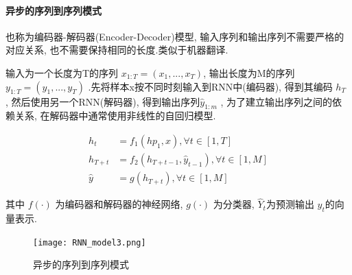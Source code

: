 \paragraph{异步的序列到序列模式}
也称为编码器-解码器(Encoder-Decoder)模型, 输入序列和输出序列不需要严格的对应关系, 也不需要保持相同的长度.类似于机器翻译.

输入为一个长度为T的序列 $ x_{1:T}=(x_1, ...,  x_T)$, 输出长度为M的序列 $ y_{1:T}=(y_1, ...,  y_T)$ .先将样本x按不同时刻输入到RNN中(编码器), 得到其编码 $h_T$ , 然后使用另一个RNN(解码器), 得到输出序列$ \hat{y}_{1:m}$ , 为了建立输出序列之间的依赖关系, 在解码器中通常使用非线性的自回归模型.

\begin{equation}
    \begin{split}
        h_t &= f_1(hp_1, x),   \forall t \in [1, T] \\
    h_{T+t}& = f_2(h_{T+t-1}, \hat{y}_{t-1}),  \forall t\in[1, M]\\
    \hat{y}&= g(h_{T+t}),   \forall t\in[1, M]
    \end{split} 
\end{equation}

其中 $f(\cdot)$ 为编码器和解码器的神经网络,  $g(\cdot)$ 为分类器,  $\hat{Y}_t$为预测输出 $\hat{y}_t$的向量表示.
\begin{figure}[!htb]
    \center
\texttt{[image: RNN\_model3.png]}
\caption{异步的序列到序列模式}
\end{figure}





